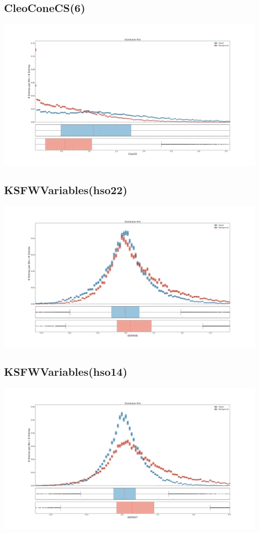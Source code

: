 \documentclass[10pt,a4paper]{article}
\begin{document}
\subsection{CleoConeCS(6)}
\begin{center}
\includegraphics[width=1.0\textwidth]{variable_-9151970233094730281.pdf}
\end{center}
\subsection{KSFWVariables(hso22)}
\begin{center}
\includegraphics[width=1.0\textwidth]{variable_-8562709785224424728.pdf}
\end{center}
\subsection{KSFWVariables(hso14)}
\begin{center}
\includegraphics[width=1.0\textwidth]{variable_5544256554683071446.pdf}
\end{center}
\end{document}
